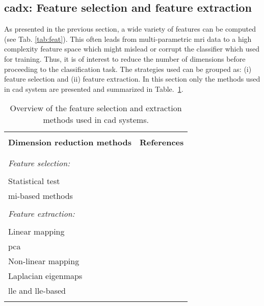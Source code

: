 \subsection{\Ac{cadx}: Feature selection and feature extraction} \label{subsec:chp3:img-clas:CADX-fea-ext}
As presented in the previous section, a wide variety of features can be computed (see Tab. \ref{tab:feat}).
This often leads from multi-parametric \ac{mri} data to a high complexity feature space which might mislead or corrupt the classifier which used for training.
Thus, it is of interest to reduce the number of dimensions before proceeding to the classification task.
The strategies used can be grouped as: (i) feature selection and (ii) feature extraction.
In this section only the methods used in \ac{cad} system are presented and summarized in Table.~\ref{tab:featext}.

\begin{table}
  \caption{Overview of the feature selection and extraction methods used in \ac{cad} systems.}
  \small
  \renewcommand{\arraystretch}{.8}
  \begin{tabular}{p{.65\linewidth} p{.25\linewidth}}
    \hline \\ [-1.5ex]
    \textbf{Dimension reduction methods} & \textbf{References} \\ \\ [-1.5ex]
    \hline \\ [-1.5ex]
    \textit{Feature selection:} & \\ \\ [-1.5ex]
    \quad Statistical test & \cite{Niaf2011,Niaf2012,Vos2012} \\
    \quad \ac{mi}-based methods & \cite{Niaf2011,Niaf2012,Vos2008} \\ \\ [-1.5ex]
    \textit{Feature extraction:} & \\ \\ [-1.5ex]
    \quad Linear mapping & \\
    \quad \quad \acs{pca} & \cite{Tiwari2008,Tiwari2009} \\
    \quad Non-linear mapping & \\
    \quad \quad Laplacian eigenmaps & \cite{Tiwari2007,Tiwari2009a,Tiwari2009,Tiwari2010,Viswanath2008,Viswanath2011} \\
    \quad \quad \acs{lle} and \acs{lle}-based & \cite{Tiwari2008,Tiwari2009,Viswanath2008a,Viswanath2008} \\ \\ [-1.5ex]
    \hline
  \end{tabular}
\label{tab:featext}
\end{table} 



